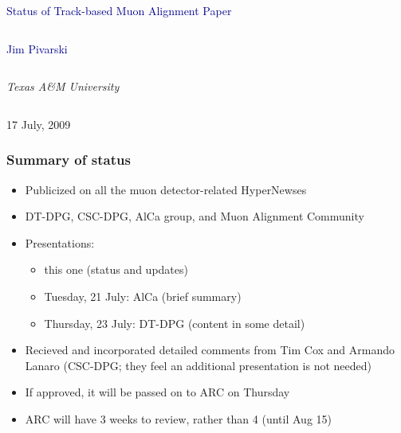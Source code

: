 \documentclass[compress]{beamer}
\begin{document}
\begin{frame}
\vfill
\begin{center}
\textcolor{darkblue}{\Large Status of Track-based Muon Alignment Paper}

\vfill
\begin{columns}
\begin{center}
\large
\textcolor{darkblue}{Jim Pivarski}
\end{center}
\end{columns}

\begin{columns}
\begin{center}
\scriptsize
{\it Texas A\&M University}
\end{center}
\end{columns}

\vfill
17 July, 2009

\end{center}
\end{frame}


\small

\begin{frame}
\frametitle{Summary of status}
\begin{itemize}\setlength{\itemsep}{0.25 cm}
\item Publicized on all the muon detector-related HyperNewses
\item DT-DPG, CSC-DPG, AlCa group, and Muon Alignment Community
\item Presentations:
\begin{itemize}
\item this one (status and updates)
\item Tuesday, 21 July: AlCa (brief summary)
\item Thursday, 23 July: DT-DPG (content in some detail)
\end{itemize}
\item Recieved and incorporated detailed comments from Tim Cox and Armando Lanaro (CSC-DPG; they feel an additional presentation is not needed)
\item If approved, it will be passed on to ARC on Thursday
\item ARC will have 3 weeks to review, rather than 4 (until Aug 15)
\end{itemize}
\end{frame}
\end{document}

